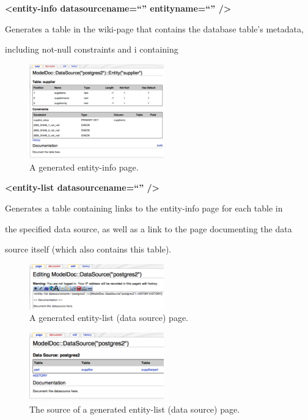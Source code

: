 \documentclass{acm_proc_article-sp}
\begin{document}
\textbf{<entity-info datasourcename=``'' entityname=``'' />}

Generates a table in the wiki-page that contains the database table's metadata,

including not-null constraints and i containing



\begin{figure}[ht]

\centering

\includegraphics[width=220px]{entity-info.pdf}

\caption{A generated entity-info page.}

\end{figure}



\textbf{<entity-list datasourcename=``'' />}

Generates a table containing links to the entity-info page for each table in

the specified data source, as well as a link to the page documenting the data

source itself (which also contains this table).



\begin{figure}[ht]

\centering

\includegraphics[width=220px]{entity-list-input.pdf}

\caption{A generated entity-list (data source) page.}

\end{figure}



\begin{figure}[ht]

\centering

\includegraphics[width=220px]{entity-list-output.pdf}

\caption{The source of a generated entity-list (data source) page.}

\end{figure}
\end{document}
